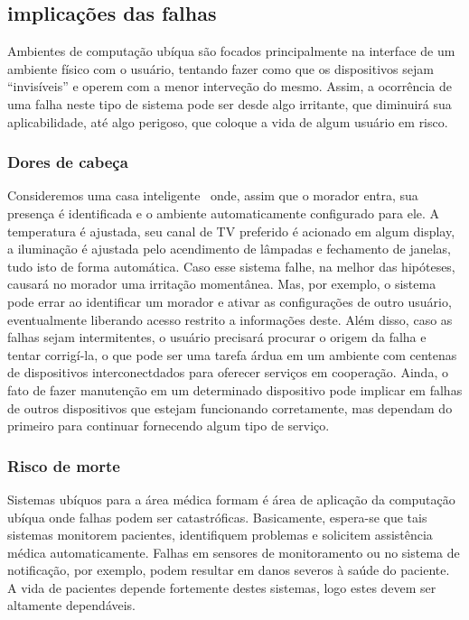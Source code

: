 
\subsection{implicações das falhas} %
\label{sub:implicacoes_das_falhas}

Ambientes de computação ubíqua são focados principalmente na interface de um ambiente físico com o usuário, tentando fazer como que os dispositivos sejam ``invisíveis'' e operem com a menor interveção do mesmo. Assim, a ocorrência de uma falha neste tipo de sistema pode ser desde algo irritante, que diminuirá sua aplicabilidade, até algo perigoso, que coloque a vida de algum usuário em risco.

\subsubsection*{Dores de cabeça}

Consideremos uma casa inteligente~\cite{Kidd99} onde, assim que o morador entra, sua presença é identificada e o ambiente automaticamente configurado para ele. A temperatura é ajustada, seu canal de TV preferido é acionado em algum display, a iluminação é ajustada pelo acendimento de lâmpadas e fechamento de janelas, tudo isto de forma automática. Caso esse sistema falhe, na melhor das hipóteses, causará no morador uma irritação momentânea. Mas, por exemplo, o sistema pode errar ao identificar um morador e ativar as configurações de outro usuário, eventualmente liberando acesso restrito a informações deste. Além disso, caso as falhas sejam intermitentes, o usuário precisará procurar o origem da falha e tentar corrigí-la, o que pode ser uma tarefa árdua em um ambiente com centenas de dispositivos interconectdados para oferecer serviços em cooperação. Ainda, o fato de fazer manutenção em um determinado dispositivo pode implicar em falhas de outros dispositivos que estejam funcionando corretamente, mas dependam do primeiro para continuar fornecendo algum tipo de serviço.

\subsubsection*{Risco de morte}

Sistemas ubíquos para a área médica formam é área de aplicação da computação ubíqua onde falhas podem ser catastróficas. Basicamente, espera-se que tais sistemas monitorem pacientes, identifiquem problemas e solicitem assistência médica automaticamente. Falhas em sensores de monitoramento ou no sistema de notificação, por exemplo, podem resultar em danos severos à saúde do paciente. A vida de pacientes depende fortemente destes sistemas, logo estes devem ser altamente dependáveis.

